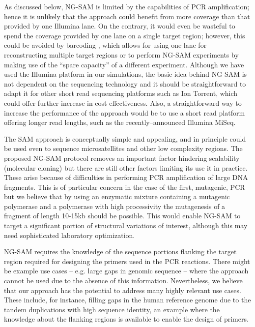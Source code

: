 \documentclass[10pt]{article}
\newcommand{\red}[1]{{\color{red} #1}}
\newcommand{\blue}[1]{{\color{blue} #1}}
\begin{document}
As discussed below, NG-SAM is limited by the capabilities of PCR amplification; hence it is unlikely that the approach could benefit from more coverage than that provided by one Illumina lane. \red{On the contrary, it would even be wasteful to spend the coverage provided by one lane on a single target region; however, this could be avoided by barcoding \cite{meyer10}, which allows for using one lane for reconstructing multiple target regions or to perform NG-SAM experiments by making use of the ``spare capacity'' of a different experiment.}
Although we have used the Illumina platform in our simulations, the basic idea behind NG-SAM is not dependent on the sequencing technology and it should be straightforward to adapt it for other short read sequencing platforms such as Ion Torrent, which could offer further increase in cost effectiveness. Also, a straightforward way to increase the performance of the approach would be to use a short read platform offering longer read lengths, such as the recently--announced Illumina MiSeq.

The SAM approach is conceptually simple and appealing, and in principle could be used even to sequence microsatellites and other low complexity regions. The proposed NG-SAM protocol removes an important factor hindering scalability (molecular cloning) but there are still other factors limiting its use it in practice. These arise because of difficulties in performing PCR amplification of large DNA fragments. This is of particular concern in the case of the first, mutagenic, PCR but we believe that by using an enzymatic mixture containing a mutagenic polymerase and a polymerase with high processivity the mutagenesis of a fragment of length 10-15kb should be possible. This would enable NG-SAM to target a significant portion of structural variations of interest, although this may need sophisticated laboratory optimization.

NG-SAM requires the knowledge of the sequence portions flanking the target region required for designing the primers used in the PCR reactions. There might be example use cases -- e.g. large gaps in genomic sequence -- where the approach cannot be used due to the absence of this information. Nevertheless, we believe that our approach has the potential to address \blue{many} highly relevant use cases. These include, for instance, filling gaps in the human reference genome due to the tandem duplications with high sequence identity, an example where the knowledge about the flanking regions is available to enable the design of primers.
\end{document}
